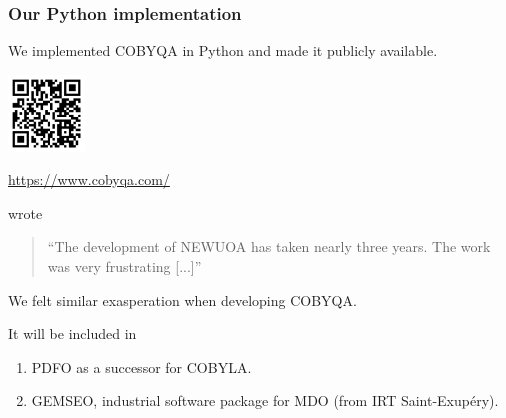 \documentclass{polyu-presentation}
\begin{document}
\begin{frame}
    \frametitle{Our Python implementation}

    We implemented COBYQA in \alert{Python} and made it \alert{publicly available}.
    
	\begin{center}
        \href{https://www.cobyqa.com/}{\includegraphics[width=0.8in]{images/qr/cobyqa.png}}

        \scriptsize\url{https://www.cobyqa.com/}
    \end{center}

    \begin{block}{}
        \textcite{Powell_2006} wrote
        \begin{quote}
            \enquote{The development of NEWUOA has taken nearly three years. The work was very frustrating [...]}
        \end{quote}
        We felt similar exasperation when developing COBYQA.
    \end{block}

    It will be included in
    \begin{enumerate}
        \item PDFO as a successor for COBYLA.
        \item GEMSEO, industrial software package for MDO (from IRT Saint-Exup{\'{e}}ry).
    \end{enumerate}
\end{frame}
\end{document}
